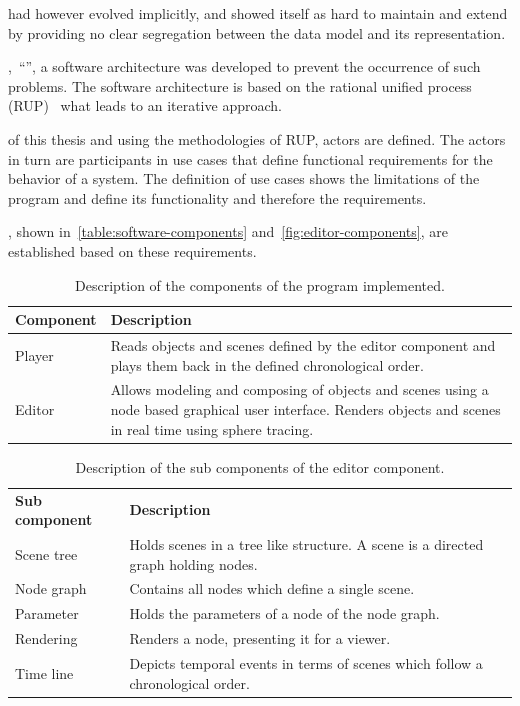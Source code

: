 \documentclass[%
    a4paper,    %
    justified,  %
    nobib,      %
    openany     %
]{tufte-book}
\begin{document}
 had however evolved implicitly,
and showed itself as hard to maintain and extend by providing no clear
segregation between the data model and its representation.

,~\enquote{}, a software architecture was
developed to prevent the occurrence of such problems. The software architecture
is based on the rational unified process (RUP)~\cite{kruchten_rup_2003} what
leads to an iterative approach.

 of this thesis and using the methodologies of
RUP, actors are defined. The actors in turn are participants in use cases that
define functional requirements for the behavior of a system. The definition of
use cases shows the limitations of the program and define its functionality and
therefore the requirements.

, shown in~\autoref{table:software-components}
and~\autoref{fig:editor-components}, are established based on these
requirements.

\begin{table}[h]
  \begin{tabularx}{\textwidth}{lX}
    \toprule
    \textbf{Component} & \textbf{Description} \\
    \midrule
    Player & Reads objects and scenes defined by the editor component and plays
    them back in the defined chronological order.\\
    Editor & Allows modeling and composing of objects and
    scenes using a node based graphical user interface. Renders objects
    and scenes in real time using sphere tracing. \\
    \bottomrule
  \end{tabularx}
  \caption{Description of the components of the program implemented.}
  \label{table:software-components}
\end{table}

\begin{table}[h]
  \begin{tabularx}{\textwidth}{lX}
    \toprule
    \textbf{Sub component} & \textbf{Description} \\
    Scene tree & Holds scenes in a tree like structure. A scene is a directed
    graph holding nodes.                                           \\
    Node graph & Contains all nodes which define a single scene.   \\
    Parameter  & Holds the parameters of a node of the node graph. \\
    Rendering  & Renders a node, presenting it for a viewer.       \\
    Time line  & Depicts temporal events in terms of scenes which follow a
    chronological order.                                           \\
    \bottomrule
  \end{tabularx}
  \caption{Description of the sub components of the editor component.}
  \label{table:editor:sub-components}
\end{table}
\end{document}
